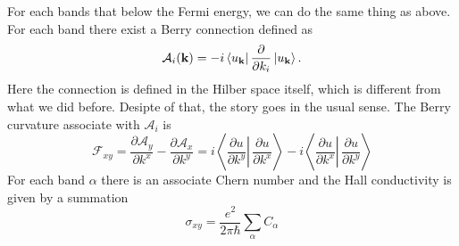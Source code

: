 \documentclass[12pt,a4paper]{article}
\numberwithin{equation}{section}
\newcommand{\pderiv}[2]{\frac{\partial #1}{\partial #2}}  %
\begin{document}
For each bands that below the Fermi energy, we can do the same thing as above. For each band there exist a Berry connection defined as
\begin{equation}
    \mathcal{A}_i(\mathbf{k}) = -i \bra{u_{\mathbf{k}}} \pderiv{}{k_i} \ket{u_{\mathbf{k}}}.
\end{equation}
Here the connection is defined in the Hilber space itself, which is different from what we did before. Desipte of that, the story goes in the usual sense. The Berry curvature associate with $\mathcal{A}_i$
is
\begin{equation}
    \label{eq:curv_chern_ins}
    \mathcal{F}_{x y}=\frac{\partial \mathcal{A}_y}{\partial k^x}-\frac{\partial \mathcal{A}_x}{\partial k^y}=i\left\langle\left.\frac{\partial u}{\partial k^y} \right\rvert\, \frac{\partial u}{\partial k^x}\right\rangle-i\left\langle\left.\frac{\partial u}{\partial k^x} \right\rvert\, \frac{\partial u}{\partial k^y}\right\rangle
\end{equation}
For each band $\alpha$ there is an associate Chern number and the Hall conductivity is given by a summation
\begin{equation}
    \label{eq:hall_insulator}
    \sigma_{xy} = \frac{e^2}{2\pi\hbar}\sum_\alpha C_\alpha
\end{equation}
\end{document}
